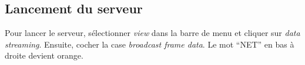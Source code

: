         \subsection{Lancement du serveur}
            Pour lancer le serveur, sélectionner \emph{view} dans la barre de menu et cliquer sur \emph{data streaming}. Ensuite, cocher la case \emph{broadcast frame data}. Le mot ``NET'' en bas à droite devient orange.



